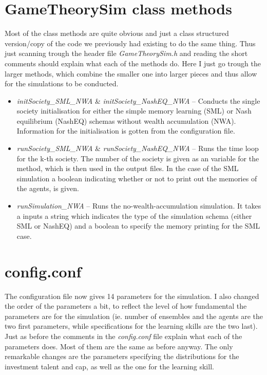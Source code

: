 \documentclass{article}
\begin{document}
\section{GameTheorySim class methods}

Most of the class methods are quite obvious and just a class structured version/copy of the code we previously had existing to do the same thing. Thus just scanning trough the header file \emph{GameTheorySim.h} and reading the short comments should explain what each of the methods do. Here I just go trough the larger methods, which combine the smaller one into larger pieces and thus allow for the simulations to be conducted. 

\begin{itemize}

\item \emph{initSociety\_SML\_NWA} \& \emph{initSociety\_NashEQ\_NWA} -- Conducts the single society initialisation for either the simple memory learning (SML) or Nash equilibrium (NashEQ) schemas without wealth accumulation (NWA). Information for the initialisation is gotten from the configuration file. 

\item \emph{runSociety\_SML\_NWA} \& \emph{runSociety\_NashEQ\_NWA} -- Runs the time loop for the k-th society. The number of the society is given as an variable for the method, which is then used in the output files. In the case of the SML simulation a boolean indicating whether or not to print out the memories of the  agents, is given. 

\item \emph{runSimulation\_NWA} -- Runs the no-wealth-accumulation simulation. It takes a inputs a string which indicates the type of the simulation schema (either SML or NashEQ) and a boolean to specify the memory printing for the SML case. 

\end{itemize} 


\section{config.conf}

The configuration file now gives 14 parameters for the simulation. I also changed the order of the parameters a bit, to reflect the level of how fundamental the parameters are for the simulation (ie. number of ensembles and the agents are the two first parameters, while specifications for the learning skills are the two last). Just as before the comments in the \emph{config.conf} file explain what each of the parameters does. Most of them are the same as before anyway. The only remarkable changes are the parameters specifying the distributions for the investment talent and cap, as well as the one for the learning skill. 
\end{document}
